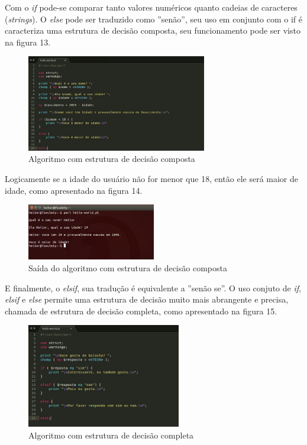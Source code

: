Com o \textit{if} pode-se comparar tanto valores num\'ericos quanto cadeias de caracteres (\textit{strings}). O \textit{else} pode ser traduzido como 
''sen\~ao'', seu uso em conjunto com o if \'e caracteriza uma estrutura de decis\~ao composta, seu funcionamento pode ser visto na figura 13.

\begin{figure}[!htb]
	\centering
	\includegraphics[width=0.7\textwidth]{../5_figuras/image13}
	\caption{Algoritmo com estrutura de decis\~ao composta}
\end{figure}

\clearpage 

Logicamente se a idade do usu\'ario n\~ao for menor que 18, ent\~ao ele ser\'a  maior de idade, como apresentado na figura 14.

\begin{figure}[!htb]
	\centering
	\includegraphics[width=0.5\textwidth]{../5_figuras/image14}
	\caption{Sa\'ida do algoritmo com estrutura de decis\~ao composta}
\end{figure}

E finalmente, o \textit{elsif}, sua tradu\c{c}\~ao \'e equivalente a ''sen\~ao se''. O uso conjuto de \textit{if}, \textit{elsif} e \textit{else} permite uma
estrutura de decis\~ao muito mais abrangente e precisa, chamada de estrutura de decis\~ao completa, como apresentado na figura 15.

\begin{figure}[!htb]
	\centering
	\includegraphics[width=0.6\textwidth]{../5_figuras/image15}
	\caption{Algoritmo com estrutura de decis\~ao completa}
\end{figure}

